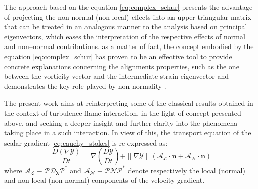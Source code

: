 The approach based on the equation \eqref{eq:complex_schur} presents the advantage of projecting the
non-normal (non-local) effects into an upper-triangular matrix that can be treated in an analogous
manner to the analysis based on principal eigenvectors, which eases the interpretation of the
respective effects of normal and non--normal contributions.
%
as a matter of fact, the concept embodied by the equation \eqref{eq:complex_schur} has proven to be 
an effective tool to provide concrete explanations concerning the alignments properties, such
as the one between the vorticity vector and the intermediate strain eigenvector and demonstrates
the key role played by non-normality \cite{keylock2018schur}.


The present work aims at reinterpreting some of the classical results obtained in 
the context of turbulence-flame interaction, in the light of concept presented above, and seeking
a deeper insight and further clarity into the phenomena taking place in a such interaction.
%
In view of this, the transport equation of the scalar gradient \eqref{eq:cauchy_stokes}
is re-expressed as:
%
\begin{equation}
\frac{D(\nabla \mathcal{Y})}{Dt} = \nabla \left( \frac{D\mathcal{Y}}{Dt}\right) +
        \|\nabla \mathcal{Y}\| \left(
        \boldsymbol{\mathcal{A_L}} \cdot \mathbf{n}
        +\boldsymbol{\mathcal{A_N}} \cdot \mathbf{n}
        \right)
\label{eq:trans_grad_schur}
\end{equation}
%
where $\boldsymbol{\mathcal{A_L}} \equiv \boldsymbol{\mathcal{P}} \boldsymbol{\mathcal{D}_{\lambda}}
\boldsymbol{\mathcal{P}}^*$ and $\boldsymbol{\mathcal{A_N}} \equiv \boldsymbol{\mathcal{P}} \boldsymbol{\mathcal{N}} \boldsymbol{\mathcal{P}}^*$  denote respectively the local (normal) and non-local 
(non-normal) components of the velocity gradient.
